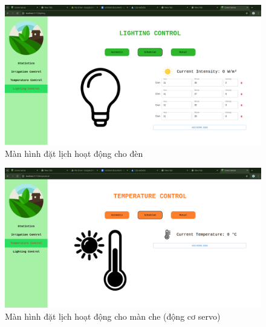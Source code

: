 \begin{figure}[H]
    \centering
    \includegraphics[width=1\linewidth]{content/images/light_job.png}
    \caption{Màn hình đặt lịch hoạt động cho đèn}
\end{figure}

\begin{figure}[H]
    \centering
    \includegraphics[width=1\linewidth]{content/images/temp_job.png}
    \caption{Màn hình đặt lịch hoạt động cho màn che (động cơ servo)}
\end{figure}

\newpage
